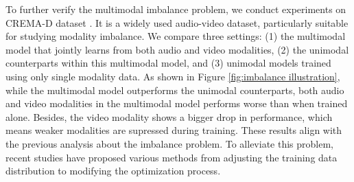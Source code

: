 To further verify the multimodal imbalance problem, we conduct experiments on CREMA-D dataset \cite{cremad}. It is a widely used audio-video dataset, particularly suitable for studying modality imbalance. We compare three settings: (1) the multimodal model that jointly learns from both audio and video modalities, (2) the unimodal counterparts within this multimodal model, and (3) unimodal models trained using only single modality data. As shown in Figure \ref{fig:imbalance illustration}, while the multimodal model outperforms the unimodal counterparts, both audio and video modalities in the multimodal model performs worse than when trained alone. Besides, the video modality shows a bigger drop in performance, which means weaker modalities are supressed during training. These results align with the previous analysis about the imbalance problem. To alleviate this problem, recent studies have proposed various methods from adjusting the training data distribution to modifying the optimization process.
